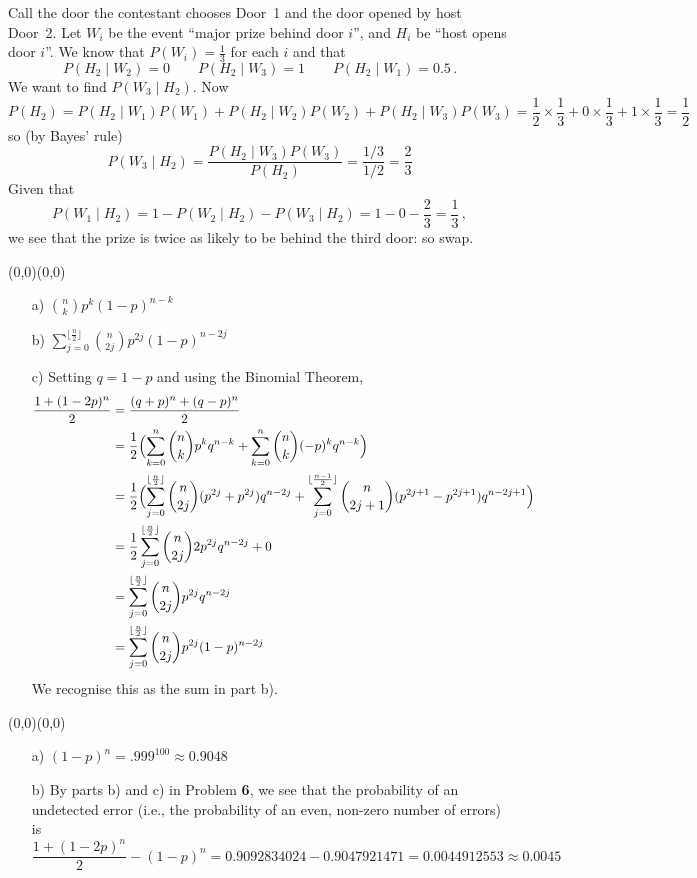 \documentclass[11pt]{article}
\newcommand{\ds}{\displaystyle}
\newcommand{\moveup}{\begin{picture}(0,0)(0,0)\end{picture}\vspace*{-8.15mm}}
\begin{document}
Call the door the contestant chooses Door~1
and the door opened by host Door~2.
Let $W_i$ be the event ``major prize behind door $i$'',
and $H_i$ be ``host opens door $i$''.
We know that $P(W_i)=\frac{1}{3}$ for each $i$ and that
\[
    P(H_2\mid W_2)
  = 0\qquad P(H_2\mid W_3)
  = 1\qquad P(H_2\mid W_1)
  = 0.5\,.
\]
We want to find $P(W_3 \mid H_2)$.
Now
\[
    P(H_2)
  = P(H_2\mid W_1) P(W_1) + P(H_2\mid W_2)P(W_2) + P(H_2\mid W_3)P(W_3)
  = \frac12\times\frac13 + 0\times\frac13 + 1\times\frac13
  = \frac12
\]
so (by Bayes' rule)
\[
    P(W_3 \mid H_2)
  = \frac{P(H_2 \mid W_3)P(W_3)}{P(H_2)}
  = \frac{1/3}{1/2}
  = \frac23
\]
Given that
\[
  P(W_1 \mid H_2) = 1 - P(W_2 \mid H_2) - P(W_3 \mid H_2) = 1 - 0 - \frac{2}{3} = \frac{1}{3}\,,
\]
we see that the prize is twice as likely to be behind the third door: so swap.

\newpage
{}\moveup
\begin{itemize}
  \item[{a)}] $\ds\binom{n}{k}p^k(1-p)^{n-k}$
  \item[{b)}] $\ds\sum_{j=0}^{\lfloor\frac{n}{2}\rfloor}\binom{n}{2j}p^{2j}(1-p)^{n-2j}$
  \item[{c)}] Setting $q = 1 - p$ and using the Binomial Theorem,
  \begin{align*}
       \frac{  1     + (1-2p)^n}{2}
    &= \frac{(q+p)^n + (q-p)^n}{2}\\
    &= \frac{1}{2}\Bigl(
         \sum_{k=0}^n \binom{n}{k}p^k q^{n-k}
        +\sum_{k=0}^n \binom{n}{k}(-p)^k q^{n-k}\Bigr)\\
    &= \frac{1}{2}\Bigl(
         \sum_{j=0}^{\lfloor\frac{n}{2}\rfloor} \binom{n}{2j}(p^{2j}+p^{2j}) q^{n-2j}
        +\sum_{j=0}^{\lfloor\frac{n-1}{2}\rfloor}  \binom{n}{2j+1}(p^{2j+1}-p^{2j+1}) q^{n-{2j+1}}\Bigr)\\
    &= \frac{1}{2}
         \sum_{j=0}^{\lfloor\frac{n}{2}\rfloor} \binom{n}{2j} 2 p^{2j} q^{n-2j} + 0\\
    &=   \sum_{j=0}^{\lfloor\frac{n}{2}\rfloor} \binom{n}{2j} p^{2j} q^{n-2j}\\
    &=   \sum_{j=0}^{\lfloor\frac{n}{2}\rfloor} \binom{n}{2j} p^{2j}(1-p)^{n-2j}
  \end{align*}
    We recognise this as the sum in part b).
\end{itemize}

\bigskip
{}\moveup
\begin{itemize}
  \item[{a)}] $(1-p)^n = .999^{100} \approx 0.9048$
  \item[{b)}] By parts b) and c) in Problem {\bf 6},
    we see that the probability of an undetected error
    (i.e., the probability of an even, non-zero number of errors)
    is
    \[
        \frac{1 + (1-2p)^n}{2} - (1-p)^n
      = 0.9092834024 - 0.9047921471
      = 0.0044912553
      \approx 0.0045
    \]
  \end{itemize}
\end{document}
